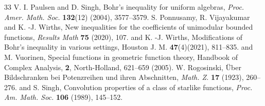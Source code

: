 \documentclass[11pt,reqno]{amsart}
\newtheorem{open problem}{Open problem}[section]
\numberwithin{equation}{section}
\begin{document}
\begin{thebibliography}{33}
 {\sc V. I. Paulsen} and {\sc D. Singh}, Bohr's inequality for uniform algebras, {\it Proc. Amer. Math. Soc.} {\bf132}(12) (2004), 3577--3579.
 {\sc S. Ponnusamy, R. Vijayakumar} and {\sc K. -J. Wirths}, New inequalities for the coefficients of unimodular bounded functions, {\it Results Math} {\bf 75} (2020), 107.
 and {\sc K. -J. Wirths}, Modifications of Bohr's inequality in various settings, Houston J. M. {\bf47}(4)(2021), 811--835.
 and {\sc M. Vuorinen}, Special functions in geometric function theory, Handbook of Complex Analysis, {\bf2}, North-Holland, 621--659 (2005).
 {\sc W. Rogosinski}, \"Uber Bildschranken bei Potenzreihen und ihren Abschnitten, {\it Math. Z.} {\bf17} (1923), 260--276.
 and {\sc S. Singh}, Convolution properties of a class of starlike functions, {\it Proc. Am. Math. Soc.} {\bf106} (1989), 145--152.
\end{thebibliography}
\end{document}
